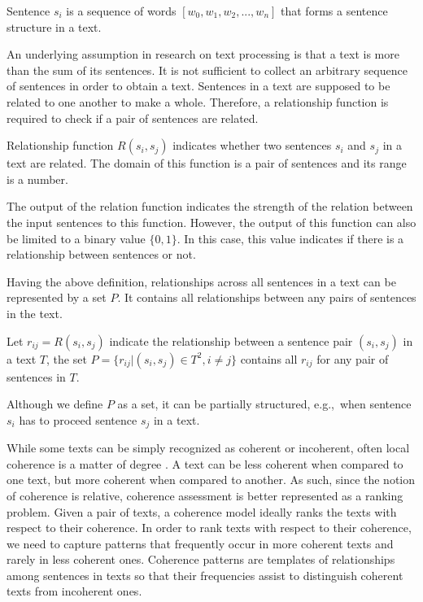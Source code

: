 \begin{definition}
Sentence $s_i$ is a sequence of words $[w_0, w_1, w_2, ... , w_n]$ that forms a sentence structure in a text. 
\end{definition}

An underlying assumption in research on text processing is that a text is more than the sum of its sentences. 
It is not sufficient to collect an arbitrary sequence of sentences in order to obtain a text. 
Sentences in a text are supposed to be related to one another to make a whole. 
Therefore, a relationship function is required to check if a pair of sentences are related. 

\begin{definition}
Relationship function $R(s_i,s_j)$ indicates whether two sentences $s_i$ and $s_j$ in a text are related. 
The domain of this function is a pair of sentences and its range is a number. 
\end{definition} 

The output of the relation function indicates the strength of the relation between the input sentences to this function. 
However, the output of this function can also be limited to a binary value $\lbrace 0,1\rbrace$. 
In this case, this value indicates if there is a relationship between sentences or not. 

Having the above definition, relationships across all sentences in a text can be represented by a set $P$. 
It contains all relationships between any pairs of sentences in the text. 

\begin{definition}
Let $r_{ij}= R(s_i,s_j)$ indicate the relationship between a sentence pair $(s_i,s_j)$ in a text $T$, the set $P = \lbrace r_{ij}| (s_i,s_j) \in T^2, i \neq j \rbrace$ contains all $r_{ij}$ for any pair of sentences in $T$.
\end{definition}  

Although we define $P$ as a set, it can be partially structured, e.g.,\ when sentence $s_i$ has to proceed sentence $s_j$ in a text. 

While some texts can be simply recognized as coherent or incoherent, often local coherence is a matter of degree \cite{halliday76}. 
A text can be less coherent when compared to one text, but more coherent when compared to another. 
As such, since the notion of coherence is relative, coherence assessment is better represented as a ranking problem. 
Given a pair of texts, a coherence model ideally ranks the texts with respect to their coherence.
In order to rank texts with respect to their coherence, we need to capture patterns that frequently occur in more coherent texts and rarely in less coherent ones.  
Coherence patterns are templates of relationships among sentences in texts so that their frequencies assist to distinguish coherent texts from incoherent ones. 

